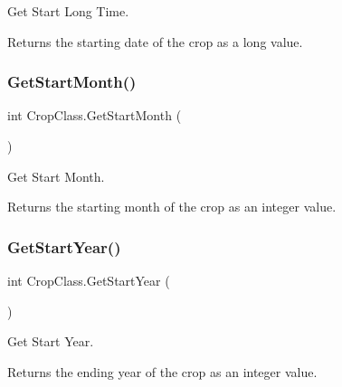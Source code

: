 Get Start Long Time. 

\begin{DoxyReturn}{Returns}
the starting date of the crop as a long value. 
\end{DoxyReturn}
\mbox{\label{class_crop_class_a7ff852ec08ae48a2171af4b77b936acf}} 
\subsubsection{\texorpdfstring{GetStartMonth()}{GetStartMonth()}}
{\footnotesize\ttfamily int Crop\+Class.\+Get\+Start\+Month (\begin{DoxyParamCaption}{ }\end{DoxyParamCaption})\hspace{0.3cm}{\ttfamily [inline]}}



Get Start Month. 

\begin{DoxyReturn}{Returns}
the starting month of the crop as an integer value. 
\end{DoxyReturn}
\mbox{\label{class_crop_class_a69c565cddd3267be4e9bf51cb3581961}} 
\subsubsection{\texorpdfstring{GetStartYear()}{GetStartYear()}}
{\footnotesize\ttfamily int Crop\+Class.\+Get\+Start\+Year (\begin{DoxyParamCaption}{ }\end{DoxyParamCaption})\hspace{0.3cm}{\ttfamily [inline]}}



Get Start Year. 

\begin{DoxyReturn}{Returns}
the ending year of the crop as an integer value. 
\end{DoxyReturn}
\mbox{\label{class_crop_class_a2b072ca8bcd2b2d08a9a5632a3f0947c}} 
